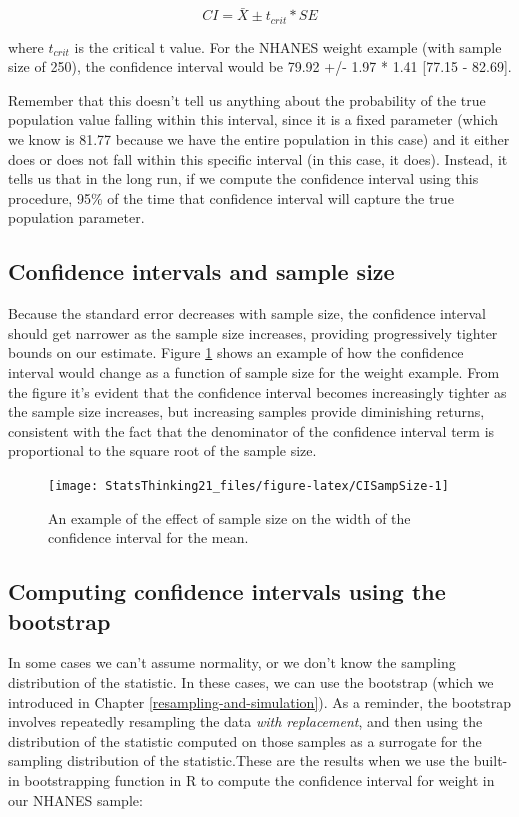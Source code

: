 \documentclass[12pt,]{book}
\theoremstyle{definition}
\theoremstyle{definition}
\theoremstyle{definition}
\theoremstyle{remark}
\begin{document}
\[
CI = \bar{X} \pm t_{crit}*SE
\]

where \(t_{crit}\) is the critical t value.
For the NHANES weight example (with sample size of 250), the confidence interval would be 79.92 +/- 1.97 * 1.41 {[}77.15 - 82.69{]}.

Remember that this doesn't tell us anything about the probability of the true population value falling within this interval, since it is a fixed parameter (which we know is 81.77 because we have the entire population in this case) and it either does or does not fall within this specific interval (in this case, it does). Instead, it tells us that in the long run, if we compute the confidence interval using this procedure, 95\% of the time that confidence interval will capture the true population parameter.

\hypertarget{confidence-intervals-and-sample-size}{%
\subsection{Confidence intervals and sample size}\label{confidence-intervals-and-sample-size}}

Because the standard error decreases with sample size, the confidence interval should get narrower as the sample size increases, providing progressively tighter bounds on our estimate. Figure \ref{fig:CISampSize} shows an example of how the confidence interval would change as a function of sample size for the weight example. From the figure it's evident that the confidence interval becomes increasingly tighter as the sample size increases, but increasing samples provide diminishing returns, consistent with the fact that the denominator of the confidence interval term is proportional to the square root of the sample size.

\begin{figure}
\texttt{[image: StatsThinking21\_files/figure-latex/CISampSize-1]} \caption{An example of the effect of sample size on the width of the confidence interval for the mean.}\label{fig:CISampSize}
\end{figure}

\hypertarget{computing-confidence-intervals-using-the-bootstrap}{%
\subsection{Computing confidence intervals using the bootstrap}\label{computing-confidence-intervals-using-the-bootstrap}}

In some cases we can't assume normality, or we don't know the sampling distribution of the statistic. In these cases, we can use the bootstrap (which we introduced in Chapter \ref{resampling-and-simulation}). As a reminder, the bootstrap involves repeatedly resampling the data \emph{with replacement}, and then using the distribution of the statistic computed on those samples as a surrogate for the sampling distribution of the statistic.These are the results when we use the built-in bootstrapping function in R to compute the confidence interval for weight in our NHANES sample:
\end{document}
